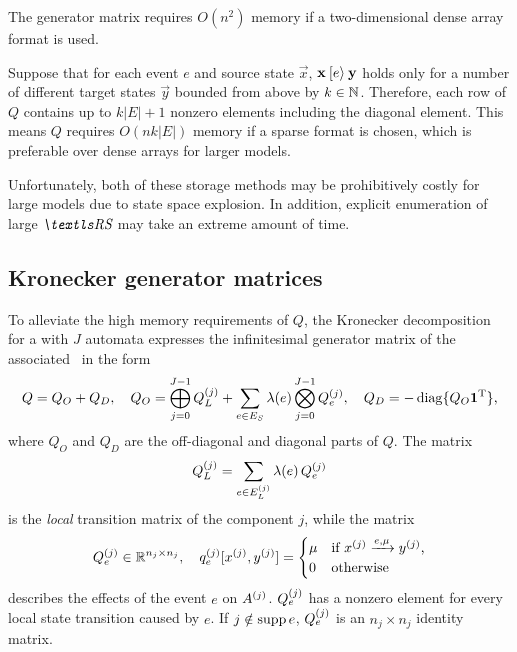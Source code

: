 The generator matrix requires $O(n^2)$ memory if a two-dimensional
dense array format is used.

Suppose that for each event $e$ and source state $\vec{x}$,
$\bm{\mathrm{x}} \mathbin{[e\rangle} \bm{\mathrm{y}}$ holds only for a number of different
target states $\vec{y}$ bounded from above by $k \in \mathbb{N}$. Therefore,
each row of $Q$ contains up to $k \lvert E \rvert + 1$ nonzero
elements including the diagonal element. This means $Q$ requires
$O(n k \lvert E \rvert)$ memory if a sparse format is chosen, which is
preferable over dense arrays for larger models.

Unfortunately, both of these storage methods may be prohibitively
costly for large models due to state space explosion. In addition,
explicit enumeration of large $\RS$ may take an extreme amount of time.

\subsection{Kronecker generator matrices}

To alleviate the high memory requirements of $Q$, the Kronecker
decomposition for a  with $J$ automata expresses the
infinitesimal generator matrix of the associated \CTMC\ in the form
\begin{equation}
  \label{eq:genstor:explicit:kronecker}
  Q = Q_O + Q_D, \quad Q_O = \bigoplus_{j = 0}^{J - 1} Q_L^{(j)}
  + \sum_{e \in E_S} \lambda(e) \bigotimes_{j = 0}^{J - 1}
  Q_{e}^{(j)}, \quad Q_D = -\operatorname{diag} \{ Q_O \bm{\mathrm{1}}^{\mathrm{T}} \} \text,
\end{equation}
where $Q_O$ and $Q_D$ are the off-diagonal and diagonal parts of
$Q$. The matrix
\begin{equation}
  Q_L^{(j)} = \sum_{e \in E_L^{(j)}} \lambda(e) \, Q_e^{(j)}
\end{equation}
is the \emph{local} transition matrix of the component $j$, while
the matrix
\begin{equation}
  Q_e^{(j)} \in \mathbb{R}^{n_j \times n_j}, \quad
  q_e^{(j)}[x^{(j)},y^{(j)}] = \begin{cases}
    \mu & \text{if $x^{(j)} \xrightarrow{e, \mu} y^{(j)}$,} \\
    0 & \text{otherwise}
  \end{cases}
\end{equation}
describes the effects of the event $e$ on $A^{(j)}$. $Q_e^{(j)}$
has a nonzero element for every local state transition caused by
$e$. If $j \notin \operatorname{supp} e$, $Q_e^{(j)}$ is an $n_j \times n_j$
identity matrix.

